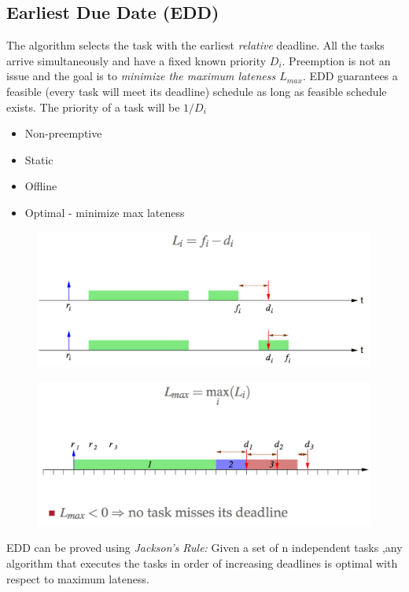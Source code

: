 \documentclass{hw}
\begin{document}
\subsection{Earliest Due Date (EDD)}
The algorithm selects the task with the earliest \emph{relative} deadline. All
the tasks arrive simultaneously and have a fixed known priority $D_{i}$. 
Preemption is not an issue and the goal is to \emph{minimize the maximum 
lateness $L_{max}$}. EDD guarantees a feasible (every task will meet its deadline)
schedule as long as feasible schedule exists. The priority of a task will be 
$1/D_{i}$
\begin{itemize}
  \item Non-preemptive
  \item Static
  \item Offline
  \item Optimal - minimize max lateness
\end{itemize}

\begin{figure}[H]
  \centering
  \includegraphics[scale=.6]{img/edd}
\end{figure}
\begin{figure}[H]
  \centering
  \includegraphics[scale=.6]{img/edd2}
\end{figure}
EDD can be proved using \emph{Jackson's Rule:} Given a set of n independent tasks
,any algorithm that executes the tasks in order of increasing deadlines is optimal
with respect to maximum lateness.
\end{document}
